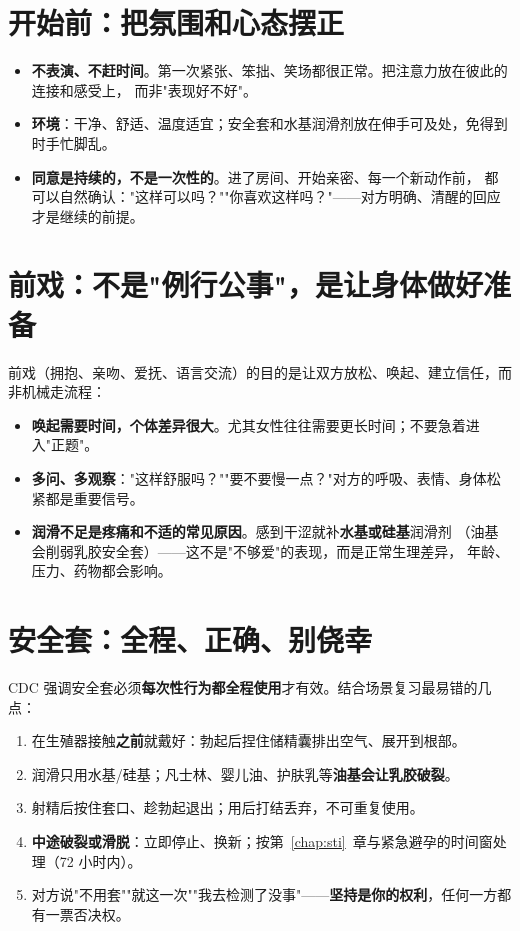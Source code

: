 \documentclass[12pt,UTF8,openany]{ctexbook}
\begin{document}
\section{开始前：把氛围和心态摆正}

\begin{itemize}[leftmargin=2em]
  \item \textbf{不表演、不赶时间}。第一次紧张、笨拙、笑场都很正常。把注意力放在彼此的连接和感受上，
        而非"表现好不好"。
  \item \textbf{环境}：干净、舒适、温度适宜；安全套和水基润滑剂放在伸手可及处，免得到时手忙脚乱。
  \item \textbf{同意是持续的，不是一次性的}。进了房间、开始亲密、每一个新动作前，
        都可以自然确认："这样可以吗？""你喜欢这样吗？"——对方明确、清醒的回应才是继续的前提。
\end{itemize}

\section{前戏：不是"例行公事"，是让身体做好准备}

前戏（拥抱、亲吻、爱抚、语言交流）的目的是让双方放松、唤起、建立信任，而非机械走流程：

\begin{itemize}[leftmargin=2em]
  \item \textbf{唤起需要时间，个体差异很大}。尤其女性往往需要更长时间；不要急着进入"正题"。
  \item \textbf{多问、多观察}："这样舒服吗？""要不要慢一点？"对方的呼吸、表情、身体松紧都是重要信号。
  \item \textbf{润滑不足是疼痛和不适的常见原因}。感到干涩就补\textbf{水基或硅基}润滑剂
        （油基会削弱乳胶安全套）——这不是"不够爱"的表现，而是正常生理差异，
        年龄、压力、药物都会影响。
\end{itemize}

\section{安全套：全程、正确、别侥幸}

CDC 强调安全套必须\textbf{每次性行为都全程使用}才有效。结合场景复习最易错的几点：

\begin{enumerate}[leftmargin=2em,itemsep=0.3em]
  \item 在生殖器接触\textbf{之前}就戴好：勃起后捏住储精囊排出空气、展开到根部。
  \item 润滑只用水基/硅基；凡士林、婴儿油、护肤乳等\textbf{油基会让乳胶破裂}。
  \item 射精后按住套口、趁勃起退出；用后打结丢弃，不可重复使用。
  \item \textbf{中途破裂或滑脱}：立即停止、换新；按第~\ref{chap:sti}~章与紧急避孕的时间窗处理（72 小时内）。
  \item 对方说"不用套""就这一次""我去检测了没事"——\textbf{坚持是你的权利}，任何一方都有一票否决权。
\end{enumerate}
\end{document}

